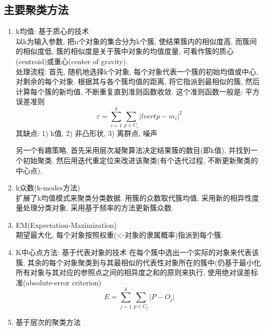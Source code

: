 \documentclass[a4paper,10pt,english]{article}
\begin{document}
\subsection {主要聚类方法}
\begin {enumerate}
\item {k均值}: 基于质心的技术\\
以k为输入参数, 把n个对象的集合分为k个簇, 使结果簇内的相似度高, 而簇间的相似度低, 簇的相似度是关于簇中对象的均值度量, 可看作簇的质心(centroid)或重心(center of gravity).\\
处理流程: 首先, 随机地选择k个对象, 每个对象代表一个簇的初始均值或中心, 对剩余的每个对象. 根据其与各个簇均值的距离, 将它指派到最相似的簇, 然后计算每个簇的新均值, 不断重复直到准则函数收敛. 这个准则函数一般是: 平方误差准则 $$ \varepsilon = \sum_{i=1}^k\sum_{p \in C_i} |lvert p - m_i \rvert^2 $$
其缺点: 1) k值, 2) 非凸形状, 3) 离群点, 噪声\\

另一个有趣策略, 首先采用层次凝聚算法决定结果簇的数目(即k值), 并找到一个初始聚类, 然后用迭代重定位来改进该聚类(有个迭代过程, 不断更新聚类的中心点).

\item {k众数(k-modes方法)}\\
扩展了k均值模式来聚类分类数据. 用簇的众数取代簇均值, 采用新的相异性度量处理分类对象, 采用基于频率的方法更新簇众数.

\item {EM(Expectation-Maximization)} \\
期望最大化, 每个对象按照权重(<-对象的隶属概率)指派到每个簇.

\item {K中心点方法}: 基于代表对象的技术
在每个簇中选出一个实际的对象来代表该簇, 其余的每个对象聚类到与其最相似的代表性对象所在的簇中(仍基于最小化所有对象与其对应的参照点之间的相异度之和的原则来执行, 使用绝对误差标准(absolute-error criterion) $$ E = \sum_{j=1}^k\sum_{p \in C_j}\lvert P - O_j \rvert$$

\item {基于层次的聚类方法}


\end{enumerate}
\end{document}
